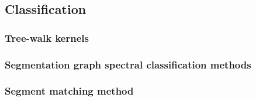 \subsection{Classification}
\subsubsection{Tree-walk kernels}

\subsubsection{Segmentation graph spectral classification methods}

\subsubsection{Segment matching method}
